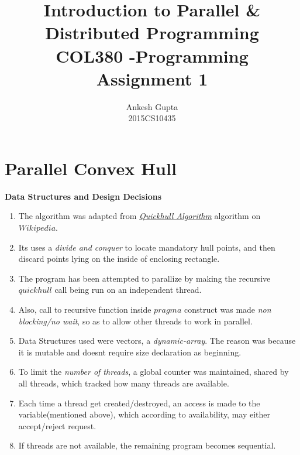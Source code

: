\documentclass{article}
\newcommand{\bld}[1]{\textbf{#1}}
\newcommand{\ital}[1]{\textit{#1}}
\begin{document}
\title{Introduction to Parallel \&
Distributed Programming\\COL380 -Programming Assignment 1}
\author{Ankesh Gupta\\2015CS10435}

\date{}
\maketitle

\section*{Parallel Convex Hull}

\bld{Data Structures and Design Decisions}
\begin{enumerate}
\item The algorithm was adapted from \href{https://en.wikipedia.org/wiki/Quickhull}{\ital{Quickhull Algorithm}} algorithm on $Wikipedia$.
\item Its uses a \ital{divide and conquer} to locate mandatory hull points, and then discard points lying on the inside of enclosing rectangle.
\item The program has been attempted to parallize by making the recursive $quickhull$ call being run on an independent thread.
\item Also, call to recursive function inside $pragma$ construct was made \ital{non blocking/no wait}, so as to allow other threads to work in parallel.
\item Data Structures used were vectors, a \ital{dynamic-array}. The reason was because it is mutable and doesnt require size declaration as beginning.
\item To limit the \ital{number of threads}, a global counter was maintained, shared by all threads, which tracked how many threads are available.
\item Each time a thread get created/destroyed, an access is made to the variable(mentioned above), which according to availability, may either accept/reject request.
\item If threads are not available, the remaining program becomes sequential.
\end{enumerate}
\end{document}

